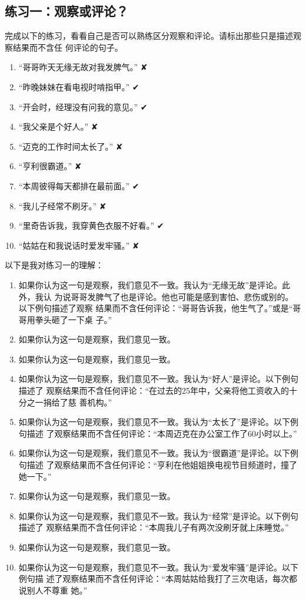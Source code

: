 \documentclass{ctexart}
\begin{document}
\subsection{练习一：观察或评论？}

完成以下的练习，看看自己是否可以熟练区分观察和评论。请标出那些只是描述观察结果而不含任
何评论的句子。

\begin{enumerate}
	\item ``哥哥昨天无缘无故对我发脾气。'' ✘
	\item ``昨晚妹妹在看电视时啃指甲。'' ✔
	\item ``开会时，经理没有问我的意见。'' ✔
	\item ``我父亲是个好人。'' ✘
	\item ``迈克的工作时间太长了。'' ✘
	\item ``亨利很霸道。'' ✘
	\item ``本周彼得每天都排在最前面。'' ✔
	\item ``我儿子经常不刷牙。'' ✘
	\item ``里奇告诉我，我穿黄色衣服不好看。'' ✔
	\item ``姑姑在和我说话时爱发牢骚。'' ✘
\end{enumerate}

以下是我对练习一的理解：

\begin{enumerate}
	\item 如果你认为这一句是观察，我们意见不一致。我认为``无缘无故''是评论。此外，我认
	      为说哥哥发脾气了也是评论。他也可能是感到害怕、悲伤或别的。以下例句描述了观察
	      结果而不含任何评论：``哥哥告诉我，他生气了。''或是``哥哥用拳头砸了一下桌
	      子。''
	\item 如果你认为这一句是观察，我们意见一致。
	\item 如果你认为这一句是观察，我们意见一致。
	\item 如果你认为这一句是观察，我们意见不一致。我认为``好人''是评论。以下例句描述了
	      观察结果而不含任何评论：``在过去的25年中，父亲将他工资收入的十分之一捐给了慈
	      善机构。''
	\item 如果你认为这一句是观察，我们意见不一致。我认为``太长了''是评论。以下例句描述
	      了观察结果而不含任何评论：``本周迈克在办公室工作了60小时以上。''
	\item 如果你认为这一句是观察，我们意见不一致。我认为``很霸道''是评论。以下例句描述
	      了观察结果而不含任何评论：``亨利在他姐姐换电视节目频道时，撞了她一下。''
	\item 如果你认为这一句是观察，我们意见一致。
	\item 如果你认为这一句是观察，我们意见不一致。我认为``经常''是评论。以下例句描述了
	      观察结果而不含任何评论：``本周我儿子有两次没刷牙就上床睡觉。''
	\item 如果你认为这一句是观察，我们意见一致。
	\item 如果你认为这一句是观察，我们意见不一致。我认为``爱发牢骚''是评论。以下例句描
	      述了观察结果而不含任何评论：``本周姑姑给我打了三次电话，每次都说别人不尊重
	      她。''
\end{enumerate}
\end{document}
